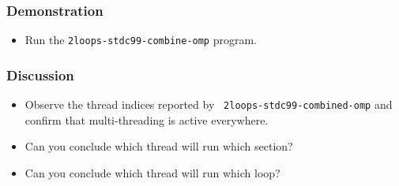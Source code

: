 \documentclass{beamer}
\begin{document}
\begin{frame}
  \frametitle{Demonstration}
  \begin{itemize}
  \item Run the {\tt 2loops-stdc99-combine-omp} program.
  \end{itemize}
\end{frame}

\begin{frame}
  \frametitle{Discussion}
  \begin{itemize}
  \item Observe the thread indices reported by {\tt
    2loops-stdc99-combined-omp} and confirm that multi-threading is
    active everywhere.
  \item Can you conclude which thread will run which section?
  \item Can you conclude which thread will run which loop?
  \end{itemize}
\end{frame}




\end{document}
